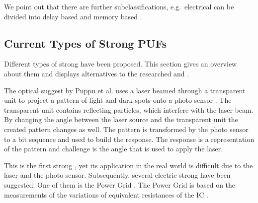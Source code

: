 We point out that there are further subclassifications, e.g.\ electrical \pufs can be divided into delay based \pufs and memory based \pufs \cite{Saha2016TV-PUFPUF}.


\subsection{Current Types of Strong PUFs}
\label{sec:typesofpufs}

Different types of strong \pufs have been proposed.
This section gives an overview about them and displays alternatives to the researched \apuf and \xpuf. 

The optical \puf suggest by Puppu et al. uses a laser beamed through a transparent unit to project a pattern of light and dark spots onto a photo sensor \cite{Pappu2001PhysicalFunctions}.
The transparent unit contains reflecting particles, which interfere with the laser beam.
By changing the angle between the laser source and the transparent unit the created pattern changes as well.
The pattern is transformed by the photo sensor to a bit sequence and used to build the response.
The \puf response is a representation of the pattern and challenge is the angle that is used to apply the laser.

This is the first strong \puf, yet its application in the real world is difficult due to the laser and the photo sensor.
Subsequently, several electric strong \puf have been suggested. %
One of them is the Power Grid \puf.
The Power Grid \puf is based on the measurements of the variations of equivalent resistances of the \ac{IC} \cite{Helinski2009AVariations}.

